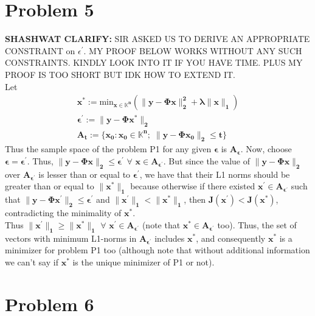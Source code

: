 \documentclass[a4paper,11pt]{article}
\numberwithin{definition}{section}
\numberwithin{mytheorem}{subsection}
\begin{document}
\section{Problem 5}
\textbf{SHASHWAT CLARIFY:} SIR ASKED US TO DERIVE AN APPROPRIATE CONSTRAINT on $\epsilon^{\prime}$. MY PROOF BELOW WORKS WITHOUT ANY SUCH CONSTRAINTS. KINDLY LOOK INTO IT IF YOU HAVE TIME. PLUS MY PROOF IS TOO SHORT BUT IDK HOW TO EXTEND IT.\\
Let
\begin{gather*}
    \boldsymbol{x^* := \mathrm{min}_{x\in\mathbb{K}^n}(\lVert y-\Phi x\rVert^2_2 + \lambda\lVert x\rVert_1)}\\
    \boldsymbol{\epsilon^{\prime} := \lVert y-\Phi x^*\rVert_2}\\
    \boldsymbol{A_t := \{x_0: x_0 \in \mathbb{K}^n;\;\lVert y-\Phi x_0\rVert_2\leq t\}}
\end{gather*}
Thus the sample space of the problem P1 for any given $\boldsymbol{\epsilon}$ is $\boldsymbol{A_{\epsilon}}$. Now, choose $\boldsymbol{\epsilon = \epsilon^{\prime}}$. Thus, $\boldsymbol{\lVert y-\Phi x\rVert_2 \leq \epsilon^{\prime}}$ $\forall$ $\boldsymbol{x\in A_{\epsilon^{\prime}}}$. But since the value of $\boldsymbol{\lVert y-\Phi x\rVert_2}$ over $\boldsymbol{A_{\epsilon^{\prime}}}$ is lesser than or equal to $\boldsymbol{\epsilon^{\prime}}$, we have that their L1 norms should be greater than or equal to $\boldsymbol{\lVert x^*\rVert_1}$ because otherwise if there existed $\boldsymbol{x^{\prime}\in A_{\epsilon^{\prime}}}$ such that $\boldsymbol{\lVert y-\Phi x^{\prime}\rVert_2 \leq \epsilon^{\prime}}$ and $\boldsymbol{\lVert x^{\prime}\rVert_1 < \lVert x^*\rVert_1}$, then $\boldsymbol{J(x^{\prime}) < J(x^*)}$, contradicting the minimality of $\boldsymbol{x^*}$.\\
Thus $\boldsymbol{\lVert x^{\prime}\rVert_1 \geq \lVert x^{*}\rVert_1}$ $\forall$ $\boldsymbol{x^{\prime}\in A_{\epsilon^{\prime}}}$ (note that $\boldsymbol{x^*\in A_{\epsilon^{\prime}}}$ too). Thus, the set of vectors with minimum L1-norms in $\boldsymbol{A_{\epsilon^{\prime}}}$ includes $\boldsymbol{x^*}$, and consequently $\boldsymbol{x^*}$ is a minimizer for problem P1 too (although note that without additional information we can't say if $\boldsymbol{x^*}$ is the unique minimizer of P1 or not).


\section{Problem 6}
\end{document}
